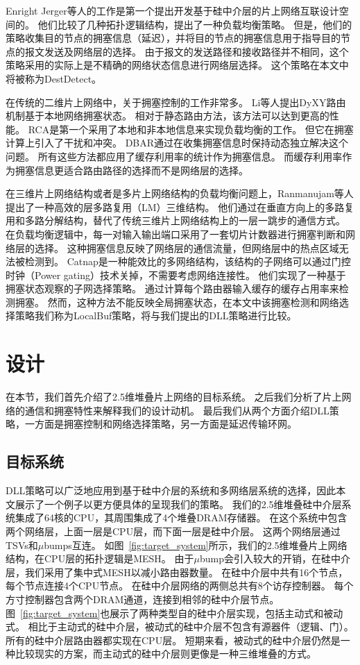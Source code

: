 Enright Jerger等人的工作是第一个提出开发基于硅中介层的片上网络互联设计空间的。
他们比较了几种拓扑逻辑结构，提出了一种负载均衡策略。
但是，他们的策略收集目的节点的拥塞信息（延迟），并将目的节点的拥塞信息用于指导目的节点的报文发送及网络层的选择。
由于报文的发送路径和接收路径并不相同，这个策略采用的实际上是不精确的网络状态信息进行网络层选择。
这个策略在本文中将被称为DestDetect。

在传统的二维片上网络中，关于拥塞控制的工作非常多。
Li等人提出DyXY路由机制基于本地网络拥塞状态。
相对于静态路由方法，该方法可以达到更高的性能。
RCA是第一个采用了本地和非本地信息来实现负载均衡的工作。
但它在拥塞计算上引入了干扰和冲突。
DBAR通过在收集拥塞信息时保持动态独立解决这个问题。
所有这些方法都应用了缓存利用率的统计作为拥塞信息。
而缓存利用率作为拥塞信息更适合路由路径的选择而不是网络层的选择。

在三维片上网络结构或者是多片上网络结构的负载均衡问题上，Ranmanujam等人提出了一种高效的层多路复用（LM）三维结构。
他们通过在垂直方向上的多路复用和多路分解结构，替代了传统三维片上网络结构上的一层一跳步的通信方式。
在负载均衡逻辑中，每一对输入输出端口采用了一套切片计数器进行拥塞判断和网络层的选择。
这种拥塞信息反映了网络层的通信流量，但网络层中的热点区域无法被检测到。
Catnap是一种能效比的多网络结构，该结构的子网络可以通过门控时钟（Power gating）技术关掉，不需要考虑网络连接性。
他们实现了一种基于拥塞状态观察的子网选择策略。
通过计算每个路由器输入缓存的缓存占用率来检测拥塞。
然而，这种方法不能反映全局拥塞状态，在本文中该拥塞检测和网络选择策略我们称为LocalBuf策略，将与我们提出的DLL策略进行比较。


\section{设计}

在本节，我们首先介绍了2.5维堆叠片上网络的目标系统。
之后我们分析了片上网络的通信和拥塞特性来解释我们的设计动机。
最后我们从两个方面介绍DLL策略，一方面是拥塞控制和网络选择策略，另一方面是延迟传输环网。

\subsection{目标系统}

DLL策略可以广泛地应用到基于硅中介层的系统和多网络层系统的选择，因此本文展示了一个例子以更方便具体的呈现我们的策略。
我们的2.5维堆叠硅中介层系统集成了64核的CPU，其周围集成了4个堆叠DRAM存储器。
在这个系统中包含两个网络层，上面一层是CPU层，而下面一层是硅中介层。
这两个网络层通过TSVs和$\mu$bumps互连。
如图~\ref{fig:target_system}所示，我们的2.5维堆叠片上网络结构，在CPU层的拓扑逻辑是MESH。
由于$\mu$bump会引入较大的开销，在硅中介层，我们采用了集中式MESH以减小路由器数量。
在硅中介层中共有16个节点，每个节点连接4个CPU节点。
在硅中介层网络的两侧总共有8个访存控制器。
每个方寸控制器包含两个DRAM通道，连接到相邻的硅中介层节点。
图~\ref{fig:target_system}也展示了两种类型自的硅中介层实现，包括主动式和被动式。
相比于主动式的硅中介层，被动式的硅中介层不包含有源器件（逻辑、门）。
所有的硅中介层路由器都实现在CPU层。
短期来看，被动式的硅中介层仍然是一种比较现实的方案，而主动式的硅中介层则更像是一种三维堆叠的方式。

